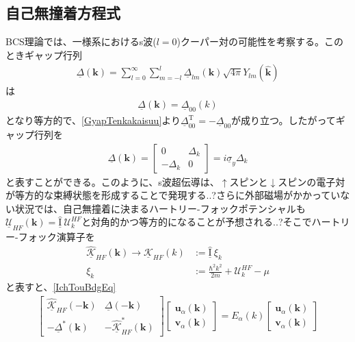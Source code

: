 \documentclass[dvipdfmx, 11pt, a4paper]{jsarticle}
\numberwithin{equation}{section}
\theoremstyle{definition}
\begin{document}
\subsection{自己無撞着方程式}
    BCS理論では、一様系におけるs波($l=0$)クーパー対の可能性を考察する。このときギャップ行列
    \begin{align}
        \underline{\Delta}(\bm{k}) = \sum_{l=0}^\infty  \sum_{m=-l}^l \underline{\Delta}_{lm}(\bm{k}) \sqrt{4\pi} Y_{lm}(\hat{\bm{k}})
    \end{align}
    は
    \begin{align}
        \underline{\Delta}(\bm{k}) =  \underline{\Delta}_{00}(k)
    \end{align}
    となり等方的で、\eqref{GyapTenkakaisuu}より$\underline{\Delta}_{00}^\mathrm{T} = - \underline{\Delta}_{00}$が成り立つ。したがってギャップ行列を
    \begin{align}
        \underline{\Delta}(\bm{k}) = 
        \left[ 
        \begin{matrix}
            0&\Delta_k\\
            -\Delta_k&0
        \end{matrix}
        \right] = i\underline{\sigma}_y \Delta_k
    \end{align}
    と表すことができる。このように、s波超伝導は、$\uparrow$スピンと$\downarrow$スピンの電子対が等方的な束縛状態を形成することで発現する..?さらに外部磁場がかかっていない状況では、自己無撞着に決まるハートリー-フォックポテンシャルも$\underline{\mathcal{U}}_{HF}(\bm{k})=\hat{\underline{\mathrm{I}}}\ \mathcal{U}^{HF}_k$と対角的かつ等方的になることが予想される..?そこでハートリー-フォック演算子を
    \begin{align}
        \hat{\underline{\mathcal{K}}}_{HF}(\bm{k}) \rightarrow\underline{\mathcal{K}}_{HF}(k) &:= \underline{\hat{\mathrm{I}}}\ \xi_k\\
        \xi_k &:= \frac{\hbar^2k^2}{2m} + \mathcal{U}^{HF}_k - \mu
    \end{align}
    と表すと、\eqref{IchTouBdgEq}
    \begin{align}
        \left[ 
        \begin{matrix}
            \underline{\hat{\mathcal{K}}}_{HF}(-\bm{k})&\underline{\Delta}(-\bm{k})\\
            -\underline{\Delta}^*(\bm{k})&-\underline{\hat{\mathcal{K}}}_{HF}^*(\bm{k})
        \end{matrix}
        \right]
        \left[
        \begin{matrix}
            \bm{u}_\alpha(\bm{k})\\
            \bm{v}_\alpha(\bm{k})
        \end{matrix}
        \right]
        =E_\alpha(k)
        \left[
        \begin{matrix}
            \bm{u}_\alpha(\bm{k})\\
            \bm{v}_\alpha(\bm{k})
        \end{matrix}
        \right]
    \end{align}
\end{document}
